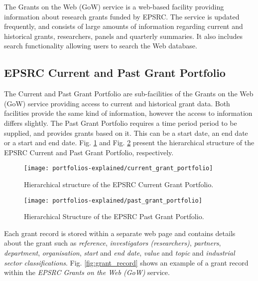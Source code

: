 The Grants on the Web (GoW) service is a web-based facility providing information about research grants funded by EPSRC. The service is updated frequently, and consists of large amounts of information regarding current and historical grants, researchers, panels and quarterly summaries. It also includes search functionality allowing users to search the Web database.

\iffalse
Each record within each entity is detailed within a separate web page. An example of how a Grant record web page looks is presented in Fig. \ref{fig:grant_record} while Fig. \ref{fig:grant_record} represents an example of a Researcher record web page. This project only makes use of the grant and researcher data.
\fi

\subsection{EPSRC Current and Past Grant Portfolio}

The Current and Past Grant Portfolio are sub-facilities of the Grants on the Web (GoW) service providing access to current and historical grant data. Both facilities provide the same kind of information, however the access to information differs slightly. The Past Grant Portfolio requires a time period period to be supplied, and provides grants based on it. This can be a start date, an end date or a start and end date. Fig. \ref{fig:current_grant_portfolio} and Fig. \ref{fig:past_grant_portfolio} present the hierarchical structure of the EPSRC Current and Past Grant Portfolio, respectively.

\begin{figure}[htpb]
    \centering
    \texttt{[image: portfolios-explained/current\_grant\_portfolio]}
    \caption{Hierarchical structure of the EPSRC Current Grant Portfolio.}
    \label{fig:current_grant_portfolio}
\end{figure}

\begin{figure}[htpb]
    \centering
    \texttt{[image: portfolios-explained/past\_grant\_portfolio]}
    \caption{Hierarchical Structure of the EPSRC Past Grant Portfolio.}
    \label{fig:past_grant_portfolio}
\end{figure}

Each grant record is stored within a separate web page and contains details about the grant such as \textit{reference}, \textit{investigators (researchers)}, \textit{partners}, \textit{department}, \textit{organisation}, \textit{start} and \textit{end date}, \textit{value} and \textit{topic} and \textit{industrial sector classifications}. Fig. \ref{fig:grant_record} shows an example of a grant record within the \textit{EPSRC Grants on the Web (GoW)} service.

